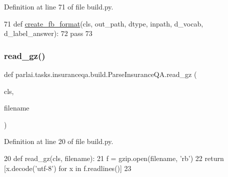 Definition at line 71 of file build.\+py.


\begin{DoxyCode}
71     \textcolor{keyword}{def }\hyperlink{namespaceparlai_1_1tasks_1_1wikiqa_1_1build_a554828702769592403db58c955d1dfe3}{create\_fb\_format}(cls, out\_path, dtype, inpath, d\_vocab, d\_label\_answer):
72         \textcolor{keywordflow}{pass}
73 
\end{DoxyCode}
\mbox{\label{classparlai_1_1tasks_1_1insuranceqa_1_1build_1_1ParseInsuranceQA_a3f2322d59e42f329387912bd3d03c888}} 
\subsubsection{\texorpdfstring{read\+\_\+gz()}{read\_gz()}}
{\footnotesize\ttfamily def parlai.\+tasks.\+insuranceqa.\+build.\+Parse\+Insurance\+Q\+A.\+read\+\_\+gz (\begin{DoxyParamCaption}\item[{}]{cls,  }\item[{}]{filename }\end{DoxyParamCaption})}



Definition at line 20 of file build.\+py.


\begin{DoxyCode}
20     \textcolor{keyword}{def }read\_gz(cls, filename):
21         f = gzip.open(filename, \textcolor{stringliteral}{'rb'})
22         \textcolor{keywordflow}{return} [x.decode(\textcolor{stringliteral}{'utf-8'}) \textcolor{keywordflow}{for} x \textcolor{keywordflow}{in} f.readlines()]
23 
\end{DoxyCode}
\mbox{\label{classparlai_1_1tasks_1_1insuranceqa_1_1build_1_1ParseInsuranceQA_a24c20a520141dbc602a242780281ee6d}} 
